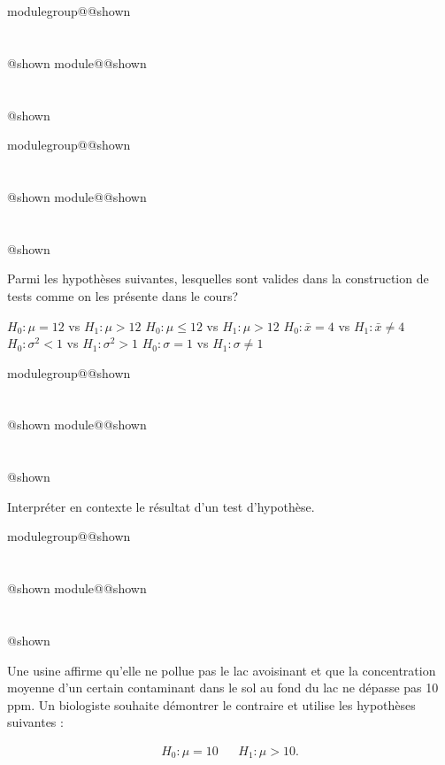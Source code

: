 \documentclass{Evaluation}
\makeatletter
\newcommand{\currentmodulekey}{}
\newcommand{\currentmoduletitle}{}
\newcommand{\currentgroupkey}{}
\newcommand{\currentgrouptitle}{}
\newcommand{\showmoduleifneeded}{%
  \ifx\currentgroupkey\empty\else
    \expandafter\ifx\csname modulegroup@\currentgroupkey @shown\endcsname\relax
      \section*{\currentgrouptitle}%
      \expandafter\gdef\csname modulegroup@\currentgroupkey @shown\endcsname{1}%
    \fi
  \fi
  \expandafter\ifx\csname module@\currentmodulekey @shown\endcsname\relax
    \section*{\currentmoduletitle}%
    \expandafter\gdef\csname module@\currentmodulekey @shown\endcsname{1}%
  \fi
}
\newenvironment{A22}{\showmoduleifneeded}{}
\newenvironment{A24}{\showmoduleifneeded}{}
\makeatother
\begin{document}
\begin{questions}
\begin{A22}
\end{A22}

\begin{A22}
\question {} %
Parmi les hypothèses suivantes, lesquelles sont valides dans la construction de tests comme on les présente dans le cours?

\begin{checkboxes}
\correctchoice $H_0 : \mu = 12$ vs $H_1 : \mu > 12$
\choice $H_0 : \mu \leq 12$ vs $H_1 : \mu > 12$
\choice $H_0 : \bar{x} = 4$ vs $H_1 : \bar{x} \ne 4$
\choice $H_0 : \sigma^2 < 1$ vs $H_1 : \sigma^2 > 1$
\correctchoice $H_0: \sigma = 1$ vs $H_1: \sigma \neq 1$
\end{checkboxes}
\end{A22}

\begin{A22}
\question {} %
Interpréter en contexte le résultat d'un test d'hypothèse.
\end{A22}

\begin{A24}
\question {} %
Une usine affirme qu’elle ne pollue pas le lac avoisinant et que la concentration moyenne d’un certain contaminant dans le sol au fond du lac ne dépasse pas 10 ppm. 
Un biologiste souhaite démontrer le contraire et utilise les hypothèses suivantes :

\begin{align*}
    H_0 : \mu = 10  & &    H_1 : \mu >10.
\end{align*}


\end{A24}
\end{questions}
\end{document}

